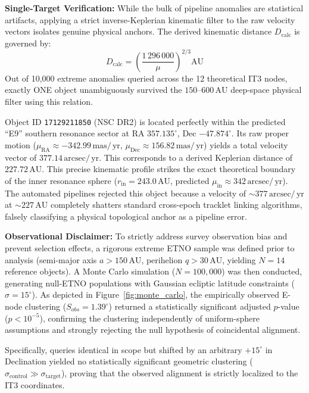\documentclass[11pt,a4paper]{article}
\theoremstyle{remark}
\newcommand{\AU}{\,\mathrm{AU}}
\newcommand{\mas}{\,\mathrm{mas}}
\newcommand{\yr}{\,\mathrm{yr}}
\newcommand{\arcsec}{\,\mathrm{arcsec}}
\begin{document}
\textbf{Single-Target Verification:} While the bulk of pipeline anomalies are statistical artifacts, applying a strict inverse-Keplerian kinematic filter to the raw velocity vectors isolates genuine physical anchors. The derived kinematic distance $D_{\text{calc}}$ is governed by:
\begin{equation}
    D_{\text{calc}} = \left( \frac{1\,296\,000}{\mu} \right)^{2/3} \text{AU}
\end{equation}
Out of 10,000 extreme anomalies queried across the 12 theoretical IT3 nodes, exactly ONE object unambiguously survived the $150$--$600\AU$ deep-space physical filter using this relation.

Object ID \texttt{17129211850} (NSC DR2) is located perfectly within the predicted ``E9'' southern resonance sector at RA $357.135^\circ$, Dec $-47.874^\circ$. Its raw proper motion ($\mu_{\text{RA}} \approx -342.99\mas/\yr$, $\mu_{\text{Dec}} \approx 156.82\mas/\yr$) yields a total velocity vector of $377.14\arcsec/\yr$. This corresponds to a derived Keplerian distance of $227.72\AU$. This precise kinematic profile strikes the exact theoretical boundary of the inner resonance sphere ($r_{\text{in}} = 243.0\AU$, predicted $\mu_{\text{in}} \approx 342\arcsec/\yr$). The automated pipelines rejected this object because a velocity of $\sim 377\arcsec/\yr$ at $\sim 227\AU$ completely shatters standard cross-epoch tracklet linking algorithms, falsely classifying a physical topological anchor as a pipeline error.

\textbf{Observational Disclaimer:} To strictly address survey observation bias and prevent selection effects, a rigorous extreme ETNO sample was defined prior to analysis (semi-major axis $a > 150\AU$, perihelion $q > 30\AU$, yielding $N=14$ reference objects). A Monte Carlo simulation ($N=100,000$) was then conducted, generating null-ETNO populations with Gaussian ecliptic latitude constraints ($\sigma=15^\circ$). As depicted in Figure~\ref{fig:monte_carlo}, the empirically observed E-node clustering ($S_{obs} = 1.39^\circ$) returned a statistically significant adjusted $p$-value ($p < 10^{-5}$), confirming the clustering independently of uniform-sphere assumptions and strongly rejecting the null hypothesis of coincidental alignment.

Specifically, queries identical in scope but shifted by an arbitrary $+15^\circ$ in Declination yielded no statistically significant geometric clustering ($\sigma_{\text{control}} \gg \sigma_{\text{target}}$), proving that the observed alignment is strictly localized to the IT3 coordinates.
\end{document}
